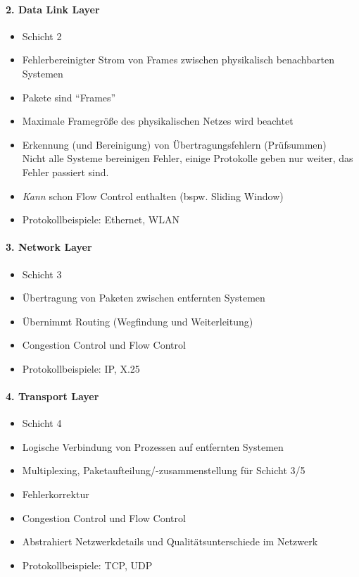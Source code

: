 	\paragraph{2. Data Link Layer}
		\begin{itemize}
			\item Schicht 2
			\item Fehlerbereinigter Strom von Frames zwischen physikalisch benachbarten Systemen
			\item Pakete sind \enquote{Frames}
			\item Maximale Framegröße des physikalischen Netzes wird beachtet
			\item Erkennung (und Bereinigung) von Übertragungsfehlern (Prüfsummen) \\ Nicht alle Systeme bereinigen Fehler, einige Protokolle geben nur weiter, das Fehler passiert sind.
			\item \textit{Kann} schon Flow Control enthalten (bspw. Sliding Window)
			\item Protokollbeispiele: Ethernet, WLAN
		\end{itemize}

	\paragraph{3. Network Layer}
		\begin{itemize}
			\item Schicht 3
			\item Übertragung von Paketen zwischen entfernten Systemen
			\item Übernimmt Routing (Wegfindung und Weiterleitung)
			\item Congestion Control und Flow Control
			\item Protokollbeispiele: IP, X.25
		\end{itemize}

	\paragraph{4. Transport Layer}
		\begin{itemize}
			\item Schicht 4
			\item Logische Verbindung von Prozessen auf entfernten Systemen
			\item Multiplexing, Paketaufteilung/-zusammenstellung für Schicht 3/5
			\item Fehlerkorrektur
			\item Congestion Control und Flow Control
			\item Abstrahiert Netzwerkdetails und Qualitätsunterschiede im Netzwerk
			\item Protokollbeispiele: TCP, UDP
		\end{itemize}

